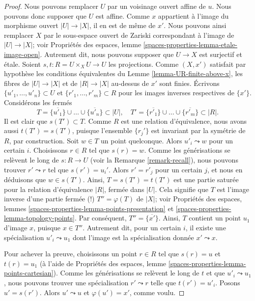 \begin{proof}
Nous pouvons remplacer $U$ par un voisinage ouvert affine de $u$.
Nous pouvons donc supposer que $U$ est affine. Comme $x$ appartient à l'image
du morphisme ouvert $|U| \to |X|$, il en est de même de $x'$. Nous pouvons
ainsi remplacer $X$ par le sous-espace ouvert de Zariski correspondant à
l'image de $|U| \to |X|$; voir
Propriétés des espaces,
lemme \ref{spaces-properties-lemma-etale-image-open}.
Autrement dit, nous pouvons supposer que
$U \to X$ est surjectif et étale.
Soient $s, t : R = U \times_X U \to U$ les projections.
Comme $(X, x')$ satisfait par hypothèse les conditions équivalentes du
Lemme \ref{lemma-UR-finite-above-x},
les fibres de $|U| \to |X|$ et de $|R| \to |X|$
au-dessus de $x'$ sont finies. Écrivons $\{u'_1, \ldots, u'_n\} \subset U$ et
$\{r'_1, \ldots, r'_m\} \subset R$ pour les images inverses respectives
de $\{x'\}$.
Considérons les fermés
$$
T = \overline{\{u'_1\}} \cup \ldots \cup \overline{\{u'_n\}} \subset |U|,
\quad
T' = \overline{\{r'_1\}} \cup \ldots \cup \overline{\{r'_m\}} \subset |R|.
$$
Il est clair que $s(T') \subset T$. Comme $R$ est une relation d'équivalence,
nous avons aussi $t(T') = s(T')$, puisque l'ensemble $\{r_j'\}$ est invariant
par la symétrie de $R$, par construction. Soit $w \in T$ un point quelconque.
Alors $u'_i \leadsto w$ pour un certain $i$. Choisissons $r \in R$
tel que $s(r) = w$. Comme les générisations se relèvent le long de
$s : R \to U$ (voir la Remarque \ref{remark-recall}), nous pouvons trouver
$r' \leadsto r$ tel que $s(r') = u_i'$. Alors $r' = r'_j$ pour un certain $j$,
et nous en déduisons que $w \in s(T')$. Ainsi,
$T = s(T') = t(T')$ est une partie saturée pour la relation d'équivalence
$|R|$, fermée dans $|U|$. Cela signifie que $T$ est l'image inverse d'une
partie fermée (!) $T'' = \varphi(T)$ de $|X|$; voir
Propriétés des espaces,
lemmes \ref{spaces-properties-lemma-points-presentation} et
\ref{spaces-properties-lemma-topology-points}.
Par conséquent, $T'' = \overline{\{x'\}}$.
Ainsi, $T$ contient un point $u_1$ d'image $x$, puisque $x \in T''$.
Autrement dit, pour un certain $i$, il existe une spécialisation
$u'_i \leadsto u_1$ dont l'image est la spécialisation donnée
$x' \leadsto x$.

\medskip\noindent
Pour achever la preuve, choisissons un point $r \in R$ tel que
$s(r) = u$ et $t(r) = u_1$ (à l'aide de
Propriétés des espaces,
lemme \ref{spaces-properties-lemma-points-cartesian}).
Comme les générisations se relèvent le long de $t$ et que
$u'_i \leadsto u_1$, nous pouvons trouver une spécialisation
$r' \leadsto r$ telle que $t(r') = u'_i$.
Posons $u' = s(r')$. Alors $u' \leadsto u$ et $\varphi(u') = x'$, comme voulu.
\end{proof}

